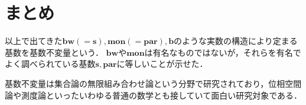 \documentclass[uplatex,dvipdfmx]{jsarticle}
\theoremstyle{definition}
\theoremstyle{named}
\begin{document}
\section{まとめ}

以上で出てきた$\mathbf{bw}(=\mathbf{s}), \mathbf{mon}(=\mathbf{par}), \mathbf{b}$のような実数の構造により定まる基数を基数不変量という．
$\mathbf{bw}$や$\mathbf{mon}$は有名なものではないが，それらを有名でよく調べられている基数$\mathbf{s}, \mathbf{par}$に等しいことが示せた．

基数不変量は集合論の無限組み合わせ論という分野で研究されており，位相空間論や測度論といったいわゆる普通の数学とも接していて面白い研究対象である．


\nocite{*}
\printbibliography[title=参考文献]
\end{document}
